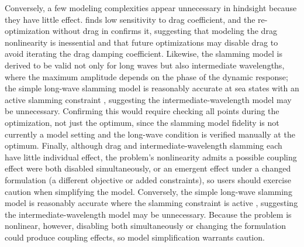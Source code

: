 \ifdefined\DISSERTATION
    Conversely, a few modeling complexities appear unnecessary in hindsight because they have little effect.
     finds low sensitivity to drag coefficient, and the re-optimization without drag in  confirms it, suggesting that modeling the drag nonlinearity is inessential and that future optimizations may disable drag to avoid iterating the drag damping coefficient.
    Likewise, the slamming model is derived to be valid not only for long waves but also intermediate wavelengths, where the maximum amplitude depends on the phase of the dynamic response; the simple long-wave slamming model is reasonably accurate at sea states with an active slamming constraint \cite{mccabe_development_2026}, suggesting the intermediate-wavelength model may be unnecessary.
    Confirming this would require checking all points during the optimization, not just the optimum, since the slamming model fidelity is not currently a model setting and the long-wave condition is verified manually at the optimum. %
    Finally, although drag and intermediate-wavelength slamming each have little individual effect, the problem's nonlinearity admits a possible coupling effect were both disabled simultaneously, or an emergent effect under a changed formulation (a different objective or added constraints), so users should exercise caution when simplifying the model.
\else
    Conversely, 
    the simple long-wave slamming model is reasonably accurate where the slamming constraint is active \cite{mccabe_development_2026}, suggesting the intermediate-wavelength model may be unnecessary.
    Because the problem is nonlinear, however, disabling both simultaneously or changing the formulation could produce coupling effects, so model simplification warrants caution.
\fi

